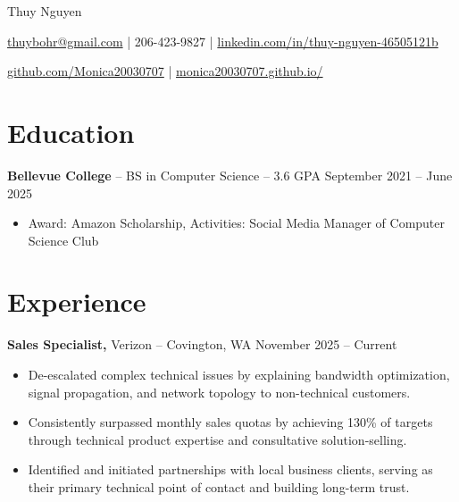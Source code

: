 \documentclass[11pt]{article}       %
\begin{document}
\centerline{\Huge Thuy Nguyen}

\vspace{5pt}

\centerline{\href{mailto:thuybohr@gmail.com}{thuybohr@gmail.com} | 206-423-9827 |
\href{https://www.linkedin.com/in/thuy-nguyen-46505121b/}{linkedin.com/in/thuy-nguyen-46505121b}}

\centerline{\href{https://github.com/Monica20030707}{github.com/Monica20030707} | 
\href{https://monica20030707.github.io/}{monica20030707.github.io/}} 

\vspace{-9pt}

\section*{Education}
\textbf{Bellevue College} -- BS in Computer Science -- 3.6 GPA \hfill September 2021 -- June 2025\\
\vspace{-9pt}
\begin{itemize}
  \item Award: Amazon Scholarship, Activities: Social Media Manager of Computer Science Club
\end{itemize}

\vspace{-18.5pt}

\section*{Experience}

\textbf{Sales Specialist,} {Verizon} -- Covington, WA \hfill November 2025 -- Current \\
\vspace{-9pt}
\begin{itemize}
  \item De-escalated complex technical issues by explaining bandwidth optimization, signal propagation, and network topology to non-technical customers.
  \item Consistently surpassed monthly sales quotas by achieving 130\% of targets through technical product expertise and consultative solution-selling.
  \item Identified and initiated partnerships with local business clients, serving as their primary technical point of contact and building long-term trust.
\end{itemize}
\end{document}
